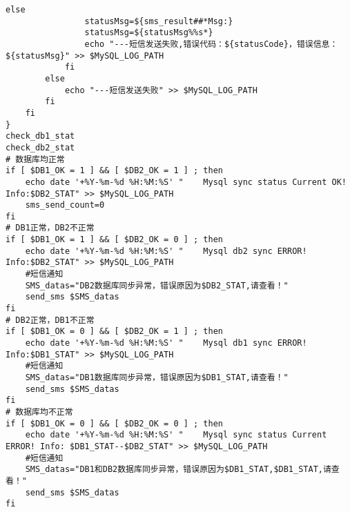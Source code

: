 \begin{lstlisting}[numbers=none]
            else
                statusMsg=${sms_result##*Msg:}
                statusMsg=${statusMsg%%s*}
                echo "---短信发送失败,错误代码：${statusCode}，错误信息：${statusMsg}" >> $MySQL_LOG_PATH
            fi
        else
            echo "---短信发送失败" >> $MySQL_LOG_PATH
        fi
    fi
}
check_db1_stat
check_db2_stat
# 数据库均正常
if [ $DB1_OK = 1 ] && [ $DB2_OK = 1 ] ; then
    echo date '+%Y-%m-%d %H:%M:%S' "    Mysql sync status Current OK! Info:$DB2_STAT" >> $MySQL_LOG_PATH
    sms_send_count=0
fi
# DB1正常，DB2不正常
if [ $DB1_OK = 1 ] && [ $DB2_OK = 0 ] ; then
    echo date '+%Y-%m-%d %H:%M:%S' "    Mysql db2 sync ERROR! Info:$DB2_STAT" >> $MySQL_LOG_PATH
    #短信通知
    SMS_datas="DB2数据库同步异常，错误原因为$DB2_STAT,请查看！"
    send_sms $SMS_datas
fi
# DB2正常，DB1不正常
if [ $DB1_OK = 0 ] && [ $DB2_OK = 1 ] ; then
    echo date '+%Y-%m-%d %H:%M:%S' "    Mysql db1 sync ERROR! Info:$DB1_STAT" >> $MySQL_LOG_PATH
    #短信通知
    SMS_datas="DB1数据库同步异常，错误原因为$DB1_STAT,请查看！"
    send_sms $SMS_datas
fi
# 数据库均不正常
if [ $DB1_OK = 0 ] && [ $DB2_OK = 0 ] ; then
    echo date '+%Y-%m-%d %H:%M:%S' "    Mysql sync status Current ERROR! Info: $DB1_STAT--$DB2_STAT" >> $MySQL_LOG_PATH
    #短信通知
    SMS_datas="DB1和DB2数据库同步异常，错误原因为$DB1_STAT,$DB1_STAT,请查看！"
    send_sms $SMS_datas
fi
\end{lstlisting}